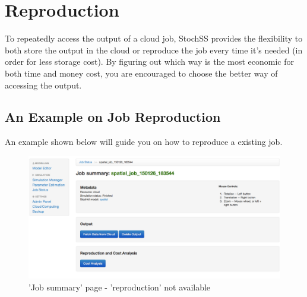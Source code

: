 \documentclass[12pt,notitlepage,nofootinbib]{revtex4}
\begin{document}
\newpage

\section{Reproduction}
To repeatedly access the output of a cloud job, StochSS provides the flexibility to both store the output in the cloud or reproduce the job every time it's needed (in order for less storage cost). By figuring out which way is the most economic for both time and money cost, you are encouraged to choose the better way of accessing the output.

\subsection{An Example on Job Reproduction}
An example shown below will guide you on how to reproduce a existing job.

\begin{figure}[!ht]
\centering
\includegraphics[scale=0.35]{T6_fig_reproduction2.png}
\caption{'Job summary' page - 'reproduction' not available}
\label{fig:2}
\end{figure}
\end{document}
